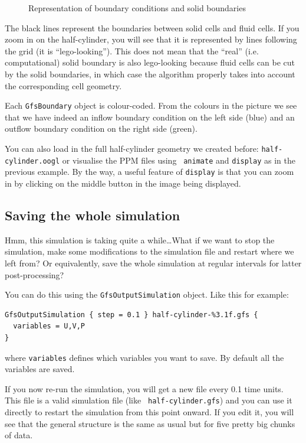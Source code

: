 \documentclass[a4paper]{article}
\begin{document}
\begin{figure}[htbp]
\begin{center}
\end{center}
\caption{Representation of boundary conditions and solid boundaries}
\label{boundaries}
\end{figure}
The black lines represent the boundaries between solid cells and fluid 
cells. If you zoom in on the half-cylinder, you will see that it is
represented by lines following the grid (it is ``lego-looking''). This 
does not mean that the ``real'' (i.e. computational) solid boundary is 
also lego-looking because fluid cells can be cut by the solid
boundaries, in which case the algorithm properly takes into account
the corresponding cell geometry.

Each {\tt GfsBoundary} object is colour-coded. From the colours in the
picture we see that we have indeed an inflow boundary condition on the
left side (blue) and an outflow boundary condition on the right side
(green).

You can also load in the full half-cylinder geometry we created
before: {\tt half-cylinder.oogl} or visualise the {\sc PPM} files using {\tt 
animate} and {\tt display} as in the previous example. By the way, a
useful feature of {\tt display} is that you can zoom in by clicking on
the middle button in the image being displayed.

\subsection{Saving the whole simulation}

Hmm, this simulation is taking quite a while\dots What if we want to
stop the simulation, make some modifications to the simulation file
and restart where we left from? Or equivalently, save the whole
simulation at regular intervals for latter post-processing?

You can do this using the {\tt GfsOutputSimulation} object. Like this
for example:
\begin{verbatim}
GfsOutputSimulation { step = 0.1 } half-cylinder-%3.1f.gfs {
  variables = U,V,P
}
\end{verbatim}
where {\tt variables} defines which variables you want to save. By
default all the variables are saved.

If you now re-run the simulation, you will get a new file every 0.1
time units. This file is a valid simulation file (like {\tt
half-cylinder.gfs}) and you can use it directly to restart the
simulation from this point onward. If you edit it, you will see that
the general structure is the same as usual but for five pretty big
chunks of data. 
\end{document}
